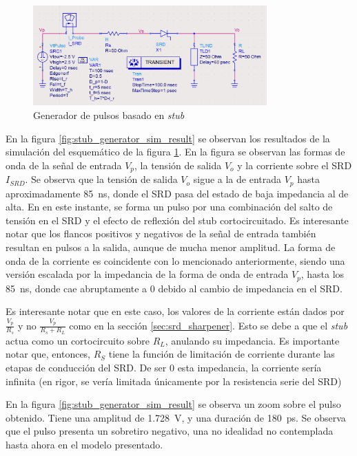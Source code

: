 \begin{figure}[tbp]
    \centering
    \includegraphics[width=0.8\textwidth]{images/stub_generator_circuit.png}
    \caption{Generador de pulsos basado en \textit{stub}}
    \label{fig:stub_generator_circuit}
\end{figure}

En la figura \ref{fig:stub_generator_sim_result} se observan los resultados de
la simulación del esquemático de la figura \ref{fig:stub_generator_circuit}. En
la figura  se observan las formas de onda de la señal de entrada $V_p$, la
tensión de salida $V_o$ y la corriente sobre el SRD $I_{SRD}$. Se observa que la
tensión de salida $V_o$ sigue a la de entrada $V_p$ hasta aproximadamente
\qty{85}{\nano\second}, donde el SRD pasa del estado de baja impedancia al de
alta. En en este instante, se forma un pulso por una combinación del salto de
tensión en el SRD y el efecto de reflexión del stub cortocircuitado. Es
interesante notar que los flancos positivos y negativos de la señal de entrada
también resultan en pulsos a la salida, aunque de mucha menor amplitud. La forma
de onda de la corriente es coincidente con lo mencionado anteriormente, siendo
una versión escalada por la impedancia de la forma de onda de entrada $V_p$,
hasta los \qty{85}{\nano\second}, donde cae abruptamente a $0$ debido al cambio
de impedancia en el SRD.

Es interesante notar que en este caso, los valores de la corriente están dados
por $\frac{V_p}{R_s}$ y no $\frac{V_p}{R_s+R_L}$ como en la sección
\ref{sec:srd_sharpener}. Esto se debe a que el \textit{stub} actua como un
cortocircuito sobre $R_L$, anulando su impedancia. Es importante notar que,
entonces, $R_S$ tiene la función de limitación de corriente durante las etapas
de conducción del SRD. De ser $0$ esta impedancia, la corriente sería infinita
(en rigor, se vería limitada únicamente por la resistencia serie del SRD)

En la figura \ref{fig:stub_generator_sim_result} se observa un zoom sobre el
pulso obtenido. Tiene una amplitud de \qty{1.728}{\volt}, y una duración
de \qty{180}{\pico\second}. Se observa que el pulso presenta un sobretiro negativo, una no idealidad no
contemplada hasta ahora en el modelo presentado.


